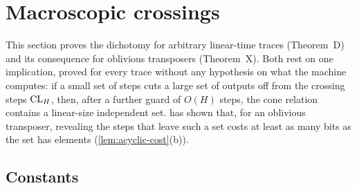 \section{Macroscopic crossings}\label{sec:crossings}

This section proves the dichotomy for arbitrary linear-time traces (Theorem~D) and its consequence for oblivious transposers
(Theorem~X). Both rest on one implication, proved for every trace without any hypothesis on what the machine computes: if a
small set of steps cuts a large set of outputs off from the crossing steps $\mathrm{CL}_H$, then, after a further guard of $O(H)$ steps, the
cone relation contains a linear-size independent set.  has shown that, for an oblivious transposer, revealing
the steps that leave such a set costs at least as many bits as the set has elements (\cref{lem:acyclic-cost}(b)).

\subsection{Constants}\label{sec:constants}

